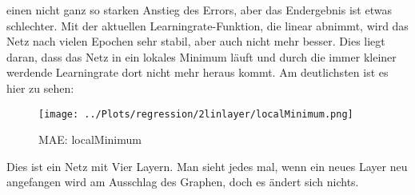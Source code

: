     einen nicht ganz so starken Anstieg des Errors, aber das Endergebnis ist etwas schlechter. 
    Mit der aktuellen Learningrate-Funktion, die linear abnimmt, wird das Netz nach vielen Epochen 
    sehr stabil, aber auch nicht mehr besser. 
    Dies liegt daran, dass das Netz in ein lokales Minimum läuft und durch die immer kleiner 
    werdende Learningrate dort nicht mehr heraus kommt. Am deutlichsten ist es hier zu sehen: 
    \begin{figure}[htpb]
        \texttt{[image: ../Plots/regression/2linlayer/localMinimum.png]}
        \caption{\label{fig:figure15} MAE: localMinimum}
    \end{figure}
    Dies ist ein Netz mit Vier Layern. Man sieht jedes mal, wenn ein neues Layer neu angefangen wird 
    am Ausschlag des Graphen, doch es ändert sich nichts.
